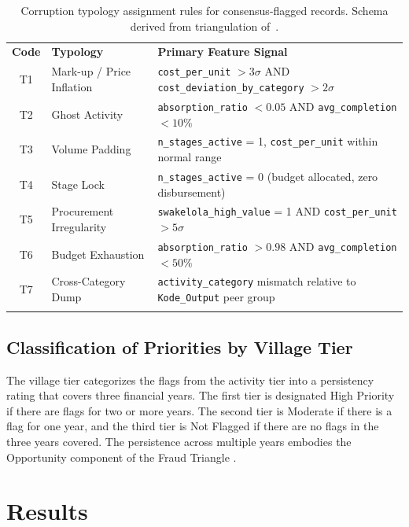 \documentclass[3p,times,procedia]{elsarticle}
\begin{document}
\begin{table}[htb]
\caption{Corruption typology assignment rules for consensus-flagged records. Schema derived from triangulation of~\cite{ref12,ref13,ref14}.}
\label{tab:typo_rules}
\begin{tabular*}{\hsize}{@{\extracolsep{\fill}}cll@{}}
\toprule
\textbf{Code} & \textbf{Typology} & \textbf{Primary Feature Signal} \\
\colrule
T1 & Mark-up / Price Inflation   & \texttt{cost\_per\_unit} $> 3\sigma$ AND \texttt{cost\_deviation\_by\_category} $> 2\sigma$ \\
T2 & Ghost Activity              & \texttt{absorption\_ratio} $< 0.05$ AND \texttt{avg\_completion} $< 10\%$ \\
T3 & Volume Padding              & \texttt{n\_stages\_active} = 1, \texttt{cost\_per\_unit} within normal range \\
T4 & Stage Lock                  & \texttt{n\_stages\_active} = 0 (budget allocated, zero disbursement) \\
T5 & Procurement Irregularity    & \texttt{swakelola\_high\_value} = 1 AND \texttt{cost\_per\_unit} $> 5\sigma$ \\
T6 & Budget Exhaustion           & \texttt{absorption\_ratio} $> 0.98$ AND \texttt{avg\_completion} $< 50\%$ \\
T7 & Cross-Category Dump         & \texttt{activity\_category} mismatch relative to \texttt{Kode\_Output} peer group \\
\botrule
\end{tabular*}

\end{table}

\subsection{Classification of Priorities by Village Tier}

The village tier categorizes the flags from the activity tier into a persistency rating that covers three financial years. The first tier is designated High Priority if there are flags for two or more years. The second tier is Moderate if there is a flag for one year, and the third tier is Not Flagged if there are no flags in the three years covered. The persistence across multiple years embodies the Opportunity component of the Fraud Triangle \cite{ref21}.

\section{Results}
\label{sec:results}
\end{document}

